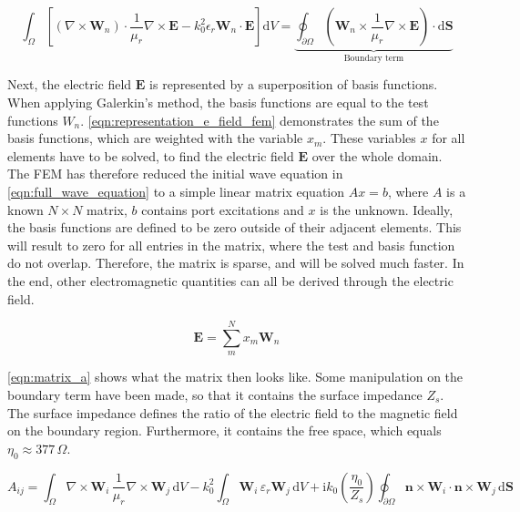 \begin{equation}
    \int_\Omega \left[ \left(\nabla \times \mathbf{W}_n \right)\cdot \frac{1}{\mu_r}\nabla\times \mathbf{E}-k_0^2\epsilon_r\mathbf{W}_n\cdot\mathbf{E}\right]\mathrm{d}V=\underbrace{\oint_{\partial\Omega}\left( \mathbf{W}_n\times \frac{1}{\mu_r}\nabla\times\mathbf{E}\right)\cdot\mathrm{d}\mathbf{S}}_{\text{Boundary term}}
    \label{eqn:greens_theorem_wave_eqn}
\end{equation}

Next, the electric field $\mathbf{E}$ is represented by a superposition of basis functions. When applying Galerkin's method, the basis functions are equal to the test functions $W_n$. \autoref{eqn:representation_e_field_fem} demonstrates the sum of the basis functions, which are weighted with the variable $x_m$. These variables $x$ for all elements have to be solved, to find the electric field $\mathbf{E}$ over the whole domain. The FEM has therefore reduced the initial wave equation in \autoref{eqn:full_wave_equation} to a simple linear matrix equation $Ax=b$, where $A$ is a known $N\times N$ matrix, $b$ contains port excitations and $x$ is the unknown. Ideally, the basis functions are defined to be zero outside of their adjacent elements. This will result to zero for all entries in the matrix, where the test and basis function do not overlap. Therefore, the matrix is sparse, and will be solved much faster. In the end, other electromagnetic quantities can all be derived through the electric field.

\begin{equation}
    \mathbf{E}=\sum^N_mx_m\mathbf{W}_n
    \label{eqn:representation_e_field_fem}
\end{equation}

\autoref{eqn:matrix_a} shows what the matrix then looks like. Some manipulation on the boundary term have been made, so that it contains the surface impedance $Z_s$. The surface impedance defines the ratio of the electric field to the magnetic field on the boundary region. Furthermore, it contains the free space, which equals $\eta_0 \approx 377\,\Omega$.

\begin{equation}
A_{ij} = \int_{\Omega} \nabla \times \mathbf{W}_i \, \frac{1}{\mu_r} \nabla \times \mathbf{W}_j \, \mathrm{d}V 
- k_0^2 \int_{\Omega} \mathbf{W}_i \, \varepsilon_r \mathbf{W}_j \, \mathrm{d}V 
+ \mathrm{i} k_0 \left(\frac{\eta_0}{Z_s}\right) \oint_{\partial\Omega} \mathbf{n} \times \mathbf{W}_i \cdot \mathbf{n} \times \mathbf{W}_j \, \mathrm{d}\mathbf{S}
\label{eqn:matrix_a}
\end{equation}

